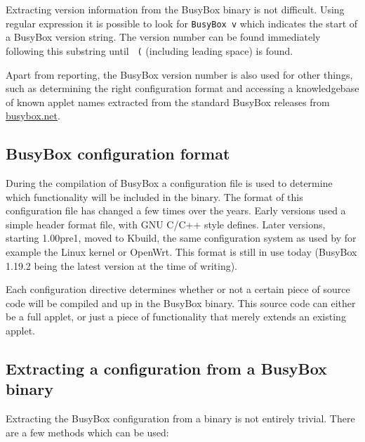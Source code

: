 \documentclass[10pt]{article}
\begin{document}
Extracting version information from the BusyBox binary is not difficult.
Using regular expression it is possible to look for \texttt{BusyBox v} which
indicates the start of a BusyBox version string. The version number can be
found immediately following this substring until \texttt{ (} (including
leading space) is found.

Apart from reporting, the BusyBox version number is also used for other
things, such as determining the right configuration format and accessing a
knowledgebase of known applet names extracted from the standard BusyBox
releases from \url{busybox.net}.

\subsection{BusyBox configuration format}

During the compilation of BusyBox a configuration file is used to determine
which functionality will be included in the binary. The format of this
configuration file has changed a few times over the years. Early versions used
a simple header format file, with GNU C/C++ style defines. Later versions,
starting 1.00pre1, moved to Kbuild, the same configuration system as used by
for example the Linux kernel or OpenWrt. This format is still in use today
(BusyBox 1.19.2 being the latest version at the time of writing).

Each configuration directive determines whether or not a certain piece of
source code will be compiled and up in the BusyBox binary. This source code can
either be a full applet, or just a piece of functionality that merely extends
an existing applet.

\subsection{Extracting a configuration from a BusyBox binary}

Extracting the BusyBox configuration from a binary is not entirely trivial.
There are a few methods which can be used:
\end{document}
